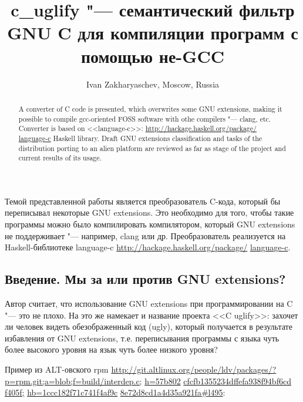 \documentclass[10pt, a5paper]{article}
\begin{document}
\title{c\_uglify "--- семантический фильтр GNU C для компиляции программ с помощью не-GCC}
\author{Ivan Zakharyaschev, Moscow, Russia}
\maketitle
\begin{abstract}
A converter of C code is presented, which overwrites some GNU extensions, making it possible to compile gcc-oriented FOSS software with othe compilers "--- clang, etc. Converter is based on <<language-c>>: \url{http://hackage.haskell.org/package/} \linebreak \url{language-c} Haskell library. Draft GNU extensions classification and tasks of the  distribution porting to an alien platform are reviewed as far as stage of the project and current results of its usage.
\end{abstract}
Темой представленной работы является преобразователь C-кода, который бы переписывал некоторые GNU extensions. Это необходимо для того, чтобы такие программы можно было компилировать компилятором, который GNU extensions не поддерживает "--- например, clang или др. Преобразователь реализуется на Haskell-библиотеке language-c \url{http://hackage.haskell.org/package/} \linebreak \url{language-c}.

\subsection*{Введение. Мы за или против GNU extensions?}

Автор считает, что использование GNU extensions при программировании на C "--- это не плохо. На это же намекает и название проекта <<C uglify>>: захочет ли человек видеть обезображенный код (ugly), который получается в результате избавления от GNU \linebreak extensions, т.е. переписывания программы с языка чуть более высокого уровня на язык чуть более низкого уровня?


Пример из ALT-овского rpm \url{http://git.altlinux.org/people/ldv/packages/?p=rpm.git;a=blob;f=build/interdep.c;} \url{h=57b802} \url{cfcfb1355234dffefa938f94bf6cd} \url{f405f;} \url{hb=1ccc182f71c741f4af9c} \url{8e72d8cd1a4d35a921fa#l495}:

\lstset{ %
anguage=C,                 %
basicstyle=\small\sffamily, %
breaklines=true,           %
breakatwhitespace=false, %
}
\end{document}
